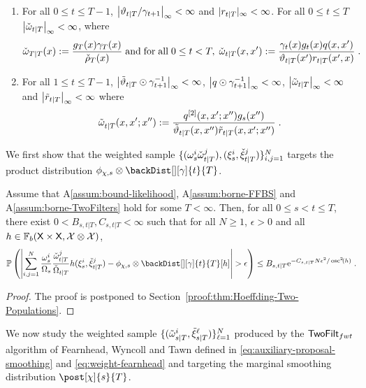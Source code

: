 \begin{assumptionA}
\label{assum:borne-TwoFilters}
\begin{enumerate}[-]
\item For all $0\le t \le T-1$, $\esssup{\adjfunc{t}{T}{}/\fakeprior_{t+1}}  < \infty$ and $|\kiss{t}{T}|_{\infty}<\infty$. For all $0\le t \le T$ $\esssup{\ebackwghtfunc{t}{T}}  < \infty$, where
\[
\ebackwghtfunc{T}{T}(x)\eqdef \frac{g_T(x)\gamma_T(x)}{\ebackinit_T(x)}\eqsp\mbox{and\;for\;all\;}0\le t< T,\eqsp \ebackwghtfunc{t}{T}(x,x')\eqdef  \frac{\gamma_t(x) g_t(x) q(x,x')}{\adjfunc{t}{T}{x'} \kiss{t}{T}(x',x)}\eqsp.
\]
\item For all $1\le t \le T-1$, $\esssup{\adjfunc[smooth]{t}{T}{} \odot \gamma_{t+1}^{-1}}< \infty$, $\esssup{q \odot \gamma_{t+1}^{-1}}< \infty$, $\esssup{\smwghtfunc{t}{T}}  < \infty$ and $\esssup{\kiss[smooth]{t}{T}}<\infty$ where
\[
\smwght{t}{T}{}(x,x';x'') \eqdef \frac{q^{[2]}(x,x';x'')  g_s(x'') }{\adjfunc[smooth]{t}{T}{x,x''}
\kiss[smooth]{t}{T}(x,x'; x'') } \eqsp.
\]
\end{enumerate}
\end{assumptionA}
We first show that the weighted sample $\{(\omega_{s}^{i} {\check{\omega}}_{t|T}^{j}), (\xi_{s}^{i},{\check{\xi}}_{t|T}^{j})\}_{i,j=1}^N$ targets the product distribution $\filt{\Xinit,s}\otimes \backDist[][\gamma]{t}{T}$.
\begin{thm}
\label{thm:Hoeffding-Two-Populations}
Assume that A\ref{assum:bound-likelihood}, A\ref{assum:borne-FFBS} and A\ref{assum:borne-TwoFilters} hold for some $T<\infty$. Then, for all $0 \leq s<t \leq T$, there exist $0 <B_{s,t|T}, C_{s,t|T} <\infty$ such that for  all  $N\ge 1$, $\epsilon > 0$ and all $h \in \mathbb{F}_b(\mathsf{X}\times \mathsf{X},\mathcal{X}\otimes\mathcal{X})$,
\begin{equation*}
\PP\left( \left| \sum_{i,j=1}^N \frac{\swght{s}{i}}{\sumwght{s}}\frac{\ebackwght{t}{T}{j}}{\backsumwght{t}{T}} h(\epartpred{s}{i},\ebackpart{t}{T}{j}) - \filt{\Xinit,s}\otimes \backDist[][\gamma]{t}{T}[h] \right| > \epsilon \right) \leq  B_{s,t|T} \rme^{-C_{s,t|T} N \epsilon^2/\oscnorm[2]{h}} \eqsp.
\end{equation*}
\end{thm}
\begin{proof}
The proof is postponed to Section~\ref{proof:thm:Hoeffding-Two-Populations}.
\end{proof}
We now study the weighted sample $\{ (\tilde{\omega}_{s|T}^{i},\tilde{\xi}_{s|T}^{\ell}) \}_{\ell=1}^N$ produced by the $\mathsf{TwoFilt}_{fwt}$ algorithm of Fearnhead, Wyncoll and Tawn \cite{fearnhead:wyncoll:tawn:2010} defined in \eqref{eq:auxiliary-proposal-smoothing} and \eqref{eq:weight-fearnhead} and targeting the marginal smoothing distribution $\post[\chi]{s}{T}$.
